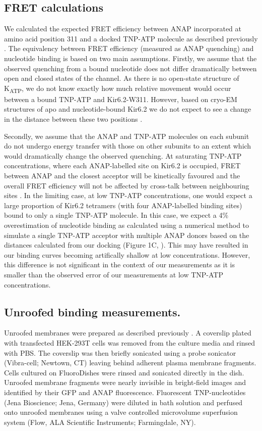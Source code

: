 \documentclass[10pt,lineno, doublespacing]{elife}
\begin{document}
\subsection{FRET calculations}
We calculated the expected FRET efficiency between ANAP incorporated at amino acid position 311 and a docked TNP-ATP molecule as described previously \citep{RN80}.
The equivalency between FRET efficiency (measured as ANAP quenching) and nucleotide binding is based on two main assumptions.
Firstly, we assume that the observed quenching from a bound nucleotide does not differ dramatically between open and closed states of the channel.
As there is no open-state structure of K\textsubscript{ATP}, we do not know exactly how much relative movement would occur between a bound TNP-ATP and Kir6.2-W311.
However, based on cryo-EM structures of apo and nucleotide-bound Kir6.2 we do not expect to see a change in the distance between these two positions \citep{RN113}.

Secondly, we assume that the ANAP and TNP-ATP molecules on each subunit do not undergo energy transfer with those on other subunits to an extent which would dramatically change the observed quenching.
At saturating TNP-ATP concentrations, where each ANAP-labelled site on Kir6.2 is occupied, FRET between ANAP and the closest acceptor will be kinetically favoured and the overall FRET efficiency will not be affected by cross-talk between neighbouring sites \citep{RN121}.
In the limiting case, at low TNP-ATP concentrations, one would expect a large proportion of Kir6.2 tetramers (with four ANAP-labelled binding sites) bound to only a single TNP-ATP molecule.
In this case, we expect a 4\% overestimation of nucleotide binding as calculated using a numerical method to simulate a single TNP-ATP acceptor with multiple ANAP donors based on the distances calculated from our docking (Figure 1C, \cite{RN120}).
This may have resulted in our binding curves becoming artifically shallow at low concentrations.
However, this difference is not significant in the context of our measurements as it is smaller than the observed error of our measurements at low TNP-ATP concentrations.

\subsection{Unroofed binding measurements.}
Unroofed membranes were prepared as described previously \citep{RN21, RN22, RN80}.
A coverslip plated with transfected HEK-293T cells was removed from the culture media and rinsed with PBS.
The coverslip was then briefly sonicated using a probe sonicator (Vibra-cell; Newtown, CT) leaving behind adherent plasma membrane fragments.
Cells cultured on FluoroDishes were rinsed and sonicated directly in the dish.
Unroofed membrane fragments were nearly invisible in bright-field images and identified by their GFP and ANAP fluorescence.
Fluorescent TNP-nucleotides (Jena Bioscience; Jena, Germany) were diluted in bath solution and perfused onto unroofed membranes using a valve controlled microvolume superfusion system (\si{\micro}Flow, ALA Scientific Instruments; Farmingdale, NY).
\end{document}

